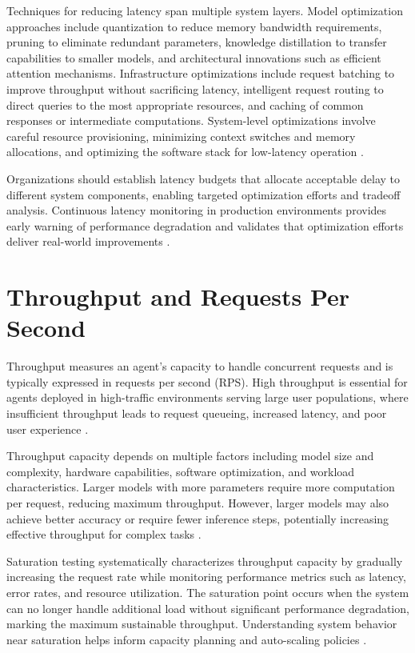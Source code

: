 \begin{TNtwocol}
Techniques for reducing latency span multiple system layers. Model optimization approaches include quantization to reduce memory bandwidth requirements, pruning to eliminate redundant parameters, knowledge distillation to transfer capabilities to smaller models, and architectural innovations such as efficient attention mechanisms. Infrastructure optimizations include request batching to improve throughput without sacrificing latency, intelligent request routing to direct queries to the most appropriate resources, and caching of common responses or intermediate computations. System-level optimizations involve careful resource provisioning, minimizing context switches and memory allocations, and optimizing the software stack for low-latency operation \cite{pope2023,langchain2024,shahrad2020}.

Organizations should establish latency budgets that allocate acceptable delay to different system components, enabling targeted optimization efforts and tradeoff analysis. Continuous latency monitoring in production environments provides early warning of performance degradation and validates that optimization efforts deliver real-world improvements \cite{langchain2024,pope2023}.

\section{Throughput and Requests Per Second}
Throughput measures an agent's capacity to handle concurrent requests and is typically expressed in requests per second (RPS). High throughput is essential for agents deployed in high-traffic environments serving large user populations, where insufficient throughput leads to request queueing, increased latency, and poor user experience \cite{langchain2024,shahrad2020,getmaximai2024}.

Throughput capacity depends on multiple factors including model size and complexity, hardware capabilities, software optimization, and workload characteristics. Larger models with more parameters require more computation per request, reducing maximum throughput. However, larger models may also achieve better accuracy or require fewer inference steps, potentially increasing effective throughput for complex tasks \cite{langchain2024,getmaximai2024}.

Saturation testing systematically characterizes throughput capacity by gradually increasing the request rate while monitoring performance metrics such as latency, error rates, and resource utilization. The saturation point occurs when the system can no longer handle additional load without significant performance degradation, marking the maximum sustainable throughput. Understanding system behavior near saturation helps inform capacity planning and auto-scaling policies \cite{getmaximai2024,shahrad2020}.


\end{TNtwocol}
